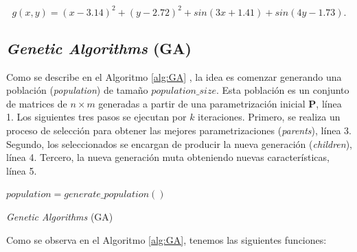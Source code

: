 \begin{equation}
  g(x, y) = (x-3.14)^2 + (y-2.72)^2 + sin(3x + 1.41) + sin(4y-1.73).
  \label{eq:example}
\end{equation}

\subsection{\emph{Genetic Algorithms} (GA)}\label{sec:ga}

Como se describe en el Algoritmo \ref{alg:GA} \citep{Mykel2019}, la idea es 
comenzar generando una población (\emph{population}) de tamaño $population\_size$.
Esta población es un conjunto de matrices de $n \times m$ generadas a partir de una parametrización
inicial $\boldsymbol{P}$, línea 1.
Los siguientes tres pasos se ejecutan por $k$ iteraciones.
Primero, se realiza un proceso de selección para obtener las mejores parametrizaciones
(\emph{parents}), línea 3.
Segundo, los seleccionados se encargan de producir la nueva generación
(\emph{children}), línea 4.
Tercero, la nueva generación muta obteniendo nuevas características, línea 5.

\begin{algorithm}
{}
$population = generate\_population()$ \\
\caption{\emph{Genetic Algorithms} (GA)}
\label{alg:GA}
\end{algorithm}

Como se observa en el Algoritmo \ref{alg:GA}, tenemos las siguientes funciones:

